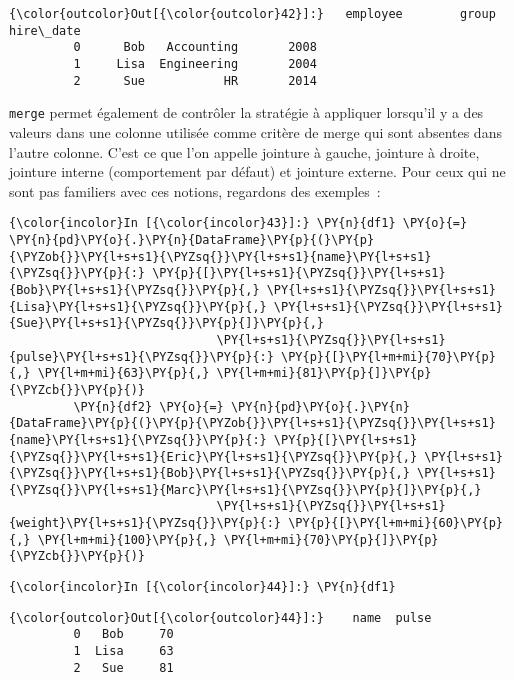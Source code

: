 \begin{Verbatim}[commandchars=\\\{\}]
{\color{outcolor}Out[{\color{outcolor}42}]:}   employee        group  hire\_date
         0      Bob   Accounting       2008
         1     Lisa  Engineering       2004
         2      Sue           HR       2014
\end{Verbatim}
            
    \texttt{merge} permet également de contrôler la stratégie à appliquer
lorsqu'il y a des valeurs dans une colonne utilisée comme critère de
merge qui sont absentes dans l'autre colonne. C'est ce que l'on appelle
jointure à gauche, jointure à droite, jointure interne (comportement par
défaut) et jointure externe. Pour ceux qui ne sont pas familiers avec
ces notions, regardons des exemples~:

    \begin{Verbatim}[commandchars=\\\{\}]
{\color{incolor}In [{\color{incolor}43}]:} \PY{n}{df1} \PY{o}{=} \PY{n}{pd}\PY{o}{.}\PY{n}{DataFrame}\PY{p}{(}\PY{p}{\PYZob{}}\PY{l+s+s1}{\PYZsq{}}\PY{l+s+s1}{name}\PY{l+s+s1}{\PYZsq{}}\PY{p}{:} \PY{p}{[}\PY{l+s+s1}{\PYZsq{}}\PY{l+s+s1}{Bob}\PY{l+s+s1}{\PYZsq{}}\PY{p}{,} \PY{l+s+s1}{\PYZsq{}}\PY{l+s+s1}{Lisa}\PY{l+s+s1}{\PYZsq{}}\PY{p}{,} \PY{l+s+s1}{\PYZsq{}}\PY{l+s+s1}{Sue}\PY{l+s+s1}{\PYZsq{}}\PY{p}{]}\PY{p}{,}
                             \PY{l+s+s1}{\PYZsq{}}\PY{l+s+s1}{pulse}\PY{l+s+s1}{\PYZsq{}}\PY{p}{:} \PY{p}{[}\PY{l+m+mi}{70}\PY{p}{,} \PY{l+m+mi}{63}\PY{p}{,} \PY{l+m+mi}{81}\PY{p}{]}\PY{p}{\PYZcb{}}\PY{p}{)}
         \PY{n}{df2} \PY{o}{=} \PY{n}{pd}\PY{o}{.}\PY{n}{DataFrame}\PY{p}{(}\PY{p}{\PYZob{}}\PY{l+s+s1}{\PYZsq{}}\PY{l+s+s1}{name}\PY{l+s+s1}{\PYZsq{}}\PY{p}{:} \PY{p}{[}\PY{l+s+s1}{\PYZsq{}}\PY{l+s+s1}{Eric}\PY{l+s+s1}{\PYZsq{}}\PY{p}{,} \PY{l+s+s1}{\PYZsq{}}\PY{l+s+s1}{Bob}\PY{l+s+s1}{\PYZsq{}}\PY{p}{,} \PY{l+s+s1}{\PYZsq{}}\PY{l+s+s1}{Marc}\PY{l+s+s1}{\PYZsq{}}\PY{p}{]}\PY{p}{,}
                             \PY{l+s+s1}{\PYZsq{}}\PY{l+s+s1}{weight}\PY{l+s+s1}{\PYZsq{}}\PY{p}{:} \PY{p}{[}\PY{l+m+mi}{60}\PY{p}{,} \PY{l+m+mi}{100}\PY{p}{,} \PY{l+m+mi}{70}\PY{p}{]}\PY{p}{\PYZcb{}}\PY{p}{)}
\end{Verbatim}


    \begin{Verbatim}[commandchars=\\\{\}]
{\color{incolor}In [{\color{incolor}44}]:} \PY{n}{df1}
\end{Verbatim}


\begin{Verbatim}[commandchars=\\\{\}]
{\color{outcolor}Out[{\color{outcolor}44}]:}    name  pulse
         0   Bob     70
         1  Lisa     63
         2   Sue     81
\end{Verbatim}
            
